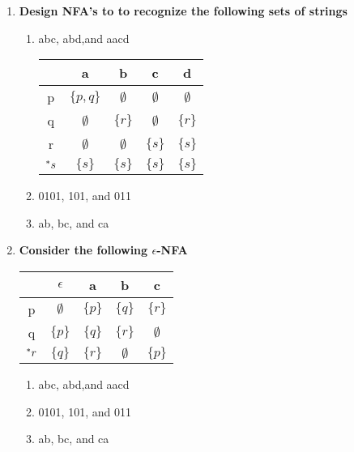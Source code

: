 \begin{enumerate}
\begin{enumerate}
	\item \textbf{Design NFA's to to recognize the following sets of strings}
		\begin{enumerate}
			\item abc, abd,and aacd 
				\begin{table}[H]
				\centering
				\begin{tabular}{c||c|c|c|c}
					&  a &  b & c & d \\ \hline
					p& $\{p,q\}$ &  $\emptyset$ & $\emptyset$ & $\emptyset$   \\ \hline
					q&  $\emptyset$ & $\{r\}$& $\emptyset$ &  $\{r\}$   \\ \hline
					r&  $\emptyset$&  $\emptyset$ & $\{s\}$& $\{s\}$  \\ \hline
					${}^\ast s$& $\{s\}$ & $\{s\}$ & $\{s\}$ & $\{s\}$ \\ \hline
				\end{tabular}
			\end{table}
		
			\item 0101, 101, and 011
			\item ab, bc, and ca 
		\end{enumerate}

	\item \textbf{Consider the following $\epsilon$-NFA}

		\begin{table}[H]
				\centering
		\begin{tabular}{c||c|c|c|c}
			&  $\epsilon$ &  a   & b & c\\ \hline
			p&  $\emptyset$ &  $\{p\}$  & $\{q\}$& $\{r\}$ \\ \hline
			q&  $\{p\}$& $\{q\}$   & $\{r\}$ &  $\emptyset$\\ \hline
			${}^\ast r$&  $\{q\}$& $\{r\}$ &  $\emptyset$ & $\{p\}$ \\ \hline
		\end{tabular}
	\end{table}

			\begin{enumerate}
		\item abc, abd,and aacd 
		\item 0101, 101, and 011
		\item ab, bc, and ca 
	\end{enumerate}
\end{enumerate}

\end{enumerate}


